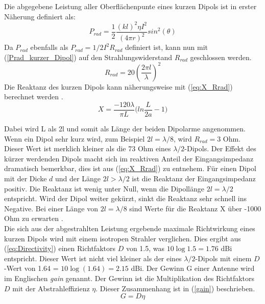Die abgegebene Leistung aller Oberflächenpunte eines kurzen Dipols ist in erster Näherung definiert als:
\begin{equation}
P_{rad}=\dfrac{1}{2}\dfrac{(kl)^{2}\eta I^{2}}{(4\pi r)^{2}}sin^{2}(\theta)
\label{Prad_kurzer_Dipol}
\end{equation}
Da $P_{rad}$ ebenfalls als $P_{rad}=1/2I^{2}R_{rad}$ definiert ist, kann nun mit (\ref{Prad_kurzer_Dipol}) auf den  Strahlungswiderstand $R_{rad}$ geschlossen werden.
\begin{equation}
R_{rad}=20 (\dfrac{2 \pi l}{\lambda})^{2}
\label{R_rad_kurzer_Dipol}
\end{equation}
Die Reaktanz des kurzen Dipols kann näherungsweise mit (\ref{eq:X_Rrad}) berechnet werden \cite{Antenne_Theory_Xant}.
\begin{equation}\label{eq:X_Rrad}
X=\dfrac{-120\lambda}{\pi L}\biggl(ln\dfrac{L}{2a}-1\biggr)
\end{equation}

Dabei wird L als 2l und somit als Länge der beiden Dipolarme angenommen.
Wenn ein Dipol sehr kurz wird, zum Beispiel $2l=\lambda/8$,  wird $R_{rad} = 3$ Ohm. Dieser Wert ist merklich kleiner als die 73 Ohm eines $\lambda/2$-Dipols. Der Effekt des kürzer werdenden Dipols macht sich im  reaktiven Anteil der Eingangsimpedanz dramatisch bemerkbar, dies ist aus (\ref{eq:X_Rrad}) zu entnehem. Für einen Dipol mit der Dicke $d$ und der Länge $2l>\lambda/2$ ist die Reaktanz der Eingangsimpedanz positiv. Die Reaktanz ist wenig unter Null, wenn die Dipollänge $2l=\lambda/2$ entspricht. Wird der Dipol weiter gekürzt,  sinkt die Reaktanz sehr schnell ins Negative. Bei einer Länge von $2l=\lambda/8$ sind Werte für die Reaktanz X über -1000 Ohm zu erwarten \cite{elliott1981antenna}. \\
Die sich aus der abgestrahlten Leistung ergebende maximale Richtwirkung eines kurzen Dipols wird mit einem isotropen Strahler verglichen. Dies ergibt aus (\ref{eq:Directivity}) einen Richtfaktors $D$ von 1.5, was $10\log{1.5}=1.76$ dBi entspricht. Dieser Wert ist nicht viel kleiner als der eines $\lambda/2$-Dipols mit einem $D$-Wert von 1.64 = $10\log{(1.64)}=2.15$ dBi. Der Gewinn G einer Antenne wird im Englischen \textit{gain} genannt. Der Gewinn ist die Multiplikation des Richtfaktors $D$ mit der Abstrahleffizienz $\eta$. Dieser Zusammenhang ist in (\ref{gain}) beschrieben.
\begin{equation}\label{gain}
G=D\eta
\end{equation}




